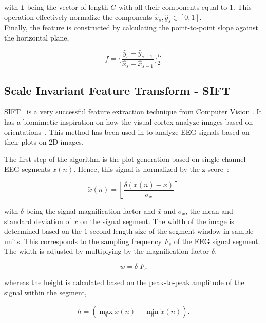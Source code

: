 \documentclass[brainsci,article,submit,moreauthors,pdftex,10pt,a4paper]{mdpi}
\begin{document}
\noindent with $\textbf{1}$ being the vector of length $G$ with all their components equal to $1$.  This operation effectively normalize the components $\hat{x}_{s},\hat{y}_{s} \in [0,1]$.\\

Finally, the feature is constructed by calculating the point-to-point slope against the horizontal plane,

\begin{equation}
f = \bigg \{  \frac{\hat{y}_{s}-\hat{y}_{s-1}}{\hat{x}_{s}-\hat{x}_{s-1}}  \bigg \}_{2}^{G} 
\label{eq:shcc8}
\end{equation}


\subsection{Scale Invariant Feature Transform - SIFT}

SIFT~\citep{Lowe2004} is a very successful feature extraction technique from Computer Vision .  It has a biomimetic inspiration on how the visual cortex analyze images based on orientations~\citep{cogprints561}.  This method has been used in \citep{Ramele2016} to analyze EEG signals based on their plots on 2D images.

The first step of the algorithm is the plot generation based on single-channel EEG segments $ x(n) $.  Hence, this signal is normalized by the z-score~\citep{Zhang2013}: 

\begin{equation}
\tilde{x}(n) = \left\lfloor \frac{\delta ( x(n) - \bar{x})}{\sigma_{x}} \right\rceil 
\label{eq:sift1}
\end{equation}

\noindent with $\delta$ being the signal magnification factor and $\bar{x}$ and $\sigma_{x}$, the mean and standard deviation of $x$ on the signal segment.  The width of the image is determined based on the $1$-second length size of the segment window in sample units. This corresponds to the sampling frequency $F_s$ of the EEG signal segment. The width is adjusted by multiplying by the magnification factor $\delta$, 

\begin{equation}
w = \delta \; F_s
\label{eq:sift2}
\end{equation}

\noindent whereas the height is calculated based on the peak-to-peak amplitude of the signal within the segment,

\begin{equation}
h = ( \max_{n} \tilde{x}(n) - \min_{n} \tilde{x}(n)).
\label{eq:sift4}
\end{equation}
\end{document}
